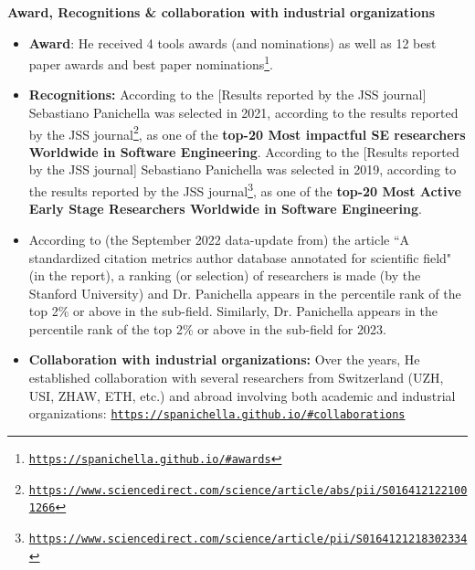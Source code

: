 \documentclass[11pt]{article}
\providecommand*\url[1]{\href{#1}{#1}}
\renewcommand*\url[1]{\href{#1}{\texttt{#1}}}
\begin{document}
\textbf{Award, Recognitions \& collaboration with industrial organizations}
\vspace{-2.5mm}
\begin{itemize}
  \item \textbf{Award}: He received 4 tools awards (and nominations) as well as 12 best paper awards and best paper nominations\footnote{\url{https://spanichella.github.io/\#awards}}.
   \vspace{-2mm}
  \item \textbf{Recognitions:} According to the [Results reported by the JSS journal] Sebastiano Panichella was selected in 2021, according to the results reported by the JSS journal\footnote{\url{https://www.sciencedirect.com/science/article/abs/pii/S0164121221001266}}, as one of the \textbf{top-20 Most impactful SE researchers Worldwide in Software Engineering}. According to the [Results reported by the JSS journal] Sebastiano Panichella was selected in 2019, according to the results reported by the JSS journal\footnote{\url{https://www.sciencedirect.com/science/article/pii/S0164121218302334}}, as one of the \textbf{top-20 Most Active Early Stage Researchers Worldwide in Software Engineering}. 
  \item According to (the September 2022 data-update from) the article ``A standardized citation metrics author database annotated for scientific field" (in the report), a ranking (or selection) of researchers is made (by the Stanford University) and Dr. Panichella appears in the percentile rank of the top 2\% or above in the sub-field. Similarly, Dr. Panichella appears in the percentile rank of the top 2\% or above in the sub-field for 2023.
  \vspace{-2mm}
   \item \textbf{Collaboration with industrial organizations:} Over the years, He established collaboration with several researchers from Switzerland (UZH, USI, ZHAW, ETH, etc.) and abroad involving both academic and industrial organizations: \url{https://spanichella.github.io/\#collaborations}
\end{itemize}
%
\end{document}
